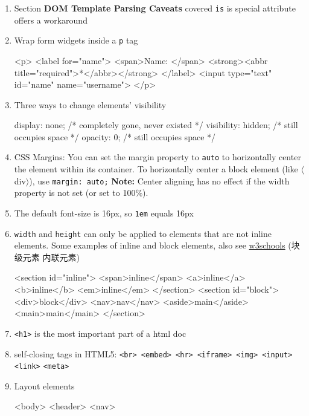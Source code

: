 \documentclass[a4paper,12pt]{article}
\begin{document}
\begin{enumerate}
\item Section \textbf{DOM Template Parsing Caveats} covered \verb|is| is special attribute offers a workaround

\item Wrap form widgets inside a \verb|p| tag
\begin{htmlcode}
<p>
  <label for="name">
    <span>Name: </span>
    <strong><abbr title="required">*</abbr></strong>
  </label>
  <input type="text" id="name" name="username">
</p>
\end{htmlcode}

\item Three ways to change elements' visibility
\begin{htmlcode}
display: none; /* completely gone, never existed */
visibility: hidden; /* still occupies space */
opacity: 0; /* still occupies space */
\end{htmlcode}

\item CSS Margins: You can set the margin property to \verb|auto| to horizontally center the element within its container. To horizontally center a block element (like $\langle$div$\rangle$), use \verb|margin: auto;| \textbf{Note:} Center aligning has no effect if the width property is not set (or set to 100\%).

\item The default font-size is 16px, so \verb|1em| equals 16px

\item \verb|width| and \verb|height| can only be applied to elements that are not inline elements. Some examples of inline and block elements, also see \href{https://www.w3schools.com/html/html_blocks.asp}{w3schools} (块级元素 内联元素)
\begin{htmlcode}
<section id="inline">
  <span>inline</span>
  <a>inline</a>
  <b>inline</b>
  <em>inline</em>
</section>
<section id="block">
  <div>block</div>
  <nav>nav</nav>
  <aside>main</aside>
  <main>main</main>
</section>
\end{htmlcode}

\item \verb|<h1>| is the most important part of a html doc

\item self-closing tags in HTML5: \verb|<br> <embed> <hr> <iframe> <img> <input> <link>| \verb|<meta>|

\item Layout elements
\begin{htmlcode}
<body>
  <header>
    <nav>


\end{htmlcode}
\end{enumerate}
\end{document}
